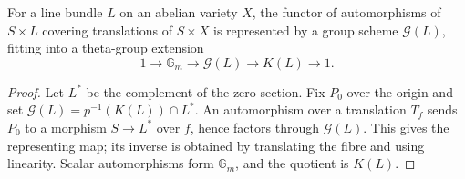\begin{theorem}
\label{mumford-thm-line-bundle-theta-group}
For a line bundle $L$ on an abelian variety $X$, the functor of automorphisms
of $S\times L$ covering translations of $S\times X$ is represented by a
group scheme $\mathcal G(L)$, fitting into a theta-group extension
\[
1\to\mathbb G_m\to\mathcal G(L)\to K(L)\to1.
\]
\end{theorem}
\begin{proof}
Let $L^*$ be the complement of the zero section. Fix $P_0$ over the origin
and set $\mathcal G(L)=p^{-1}(K(L))\cap L^*$. An automorphism over a
translation $T_f$ sends $P_0$ to a morphism $S\to L^*$ over $f$, hence
factors through $\mathcal G(L)$. This gives the representing map; its
inverse is obtained by translating the fibre and using linearity. Scalar
automorphisms form $\mathbb G_m$, and the quotient is $K(L)$.
\end{proof}
